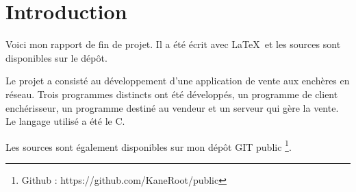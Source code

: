 \chapter{Introduction}

Voici mon rapport de fin de projet.
Il a été écrit avec \LaTeX ~et les sources sont disponibles sur le dépôt.

Le projet a consisté au développement d'une application de vente aux enchères en réseau.
Trois programmes distincts ont été développés, un programme de client enchérisseur, 
un programme destiné au vendeur et un serveur qui gère la vente.
Le langage utilisé a été le C.

Les sources sont également disponibles sur mon dépôt GIT \cite{GIT} public
\protect\footnote{
Github : https://github.com/KaneRoot/public
}.
